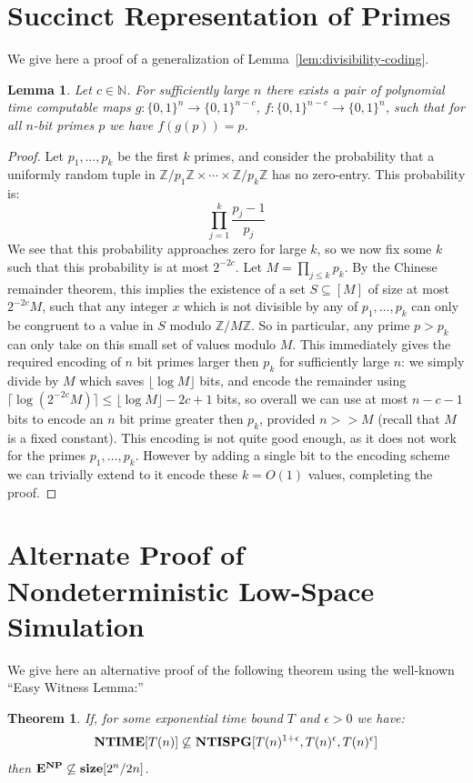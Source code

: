 \documentclass[11pt]{article}
\newtheorem*{theorem*}{Theorem}
\newtheorem*{lemma*}{Lemma}
\newcommand{\B}{\{0,1\}}
\def\cl{\bf}
\begin{document}
\section{Succinct Representation of Primes}\label{appendix:primes}
We give here a proof of a generalization of Lemma~\ref{lem:divisibility-coding}.
\begin{lemma*}
Let $c \in \mathbb{N}$. For sufficiently large $n$ there exists a pair of polynomial time computable maps $g\colon \B^n \rightarrow \B^{n-c}$, $f\colon \B^{n-c} \rightarrow \B^n$, such that for all $n$-bit primes $p$ we have $f(g(p)) = p$.
\end{lemma*}
\begin{proof}
Let $p_1,\ldots,p_k$ be the first $k$ primes, and consider the probability that a uniformly random tuple in $\mathbb{Z}/p_1\mathbb{Z} \times \cdots \times \mathbb{Z}/p_k\mathbb{Z}$ has no zero-entry. This probability is:
\[
\prod\limits_{j=1}^k \frac{p_j-1}{p_j}
\]
We see that this probability approaches zero for large $k$, so we now fix some $k$ such that this probability is at most $2^{-2c}$. Let $M = \prod\limits_{j \leq k} p_k$. By the Chinese remainder theorem, this implies the existence of a set $S \subseteq [M]$ of size at most $2^{-2c}M$, such that any integer $x$ which is not divisible by any of $p_1,\ldots,p_k$ can only be congruent to a value in $S$ modulo $\mathbb{Z}/M\mathbb{Z}$. So in particular, any prime $p > p_k$ can only take on this small set of values modulo $M$. This immediately gives the required encoding of $n$ bit primes larger then $p_k$ for sufficiently large $n$: we simply divide by $M$ which saves $\lfloor \log M \rfloor$ bits, and encode the remainder using $\lceil \log (2^{-2c} M) \rceil \leq \lfloor \log M \rfloor - 2c + 1$ bits, so overall we can use at most $n - c - 1$ bits to encode an $n$ bit prime greater then $p_k$, provided $n >> M$ (recall that $M$ is a fixed constant). This encoding is not quite good enough, as it does not work for the primes $p_1,\ldots,p_k$. However by adding a single bit to the encoding scheme we can trivially extend to it encode these $k = O(1)$ values, completing the proof.
\end{proof}

\section{Alternate Proof of Nondeterministic Low-Space Simulation}\label{appendix:ewl}

We give here an alternative proof of the following theorem using the well-known ``Easy Witness Lemma:''
\begin{theorem*}
If, for some exponential time bound $T$ and $\epsilon > 0$ we have:
\[
{\cl NTIME}[T(n)] \not\subseteq {\cl NTISPG}[T(n)^{1+\epsilon}, T(n)^{\epsilon}, T(n)^{\epsilon}]
\]
then ${\cl E}^{\cl NP} \not\subseteq {\cl size}[2^n/2n]$.
\end{theorem*}
\end{document}

